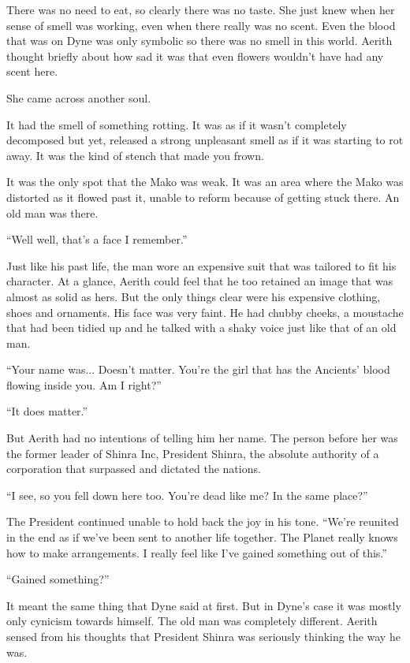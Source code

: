\documentclass[oneside]{book}
\begin{document}
There was no need to eat, so clearly there was no taste. She just knew when her sense of smell was working, even when there really was no scent. Even the blood that was on Dyne was only symbolic so there was no smell in this world. Aerith thought briefly about how sad it was that even flowers wouldn't have had any scent here.

She came across another soul.

It had the smell of something rotting. It was as if it wasn't completely decomposed but yet, released a strong unpleasant smell as if it was starting to rot away. It was the kind of stench that made you frown.

It was the only spot that the Mako was weak. It was an area where the Mako was distorted as it flowed past it, unable to reform because of getting stuck there. An old man was there.

“Well well, that's a face I remember.”

Just like his past life, the man wore an expensive suit that was tailored to fit his character. At a glance, Aerith could feel that he too retained an image that was almost as solid as hers. But the only things clear were his expensive clothing, shoes and ornaments. His face was very faint. He had chubby cheeks, a moustache that had been tidied up and he talked with a shaky voice just like that of an old man.

“Your name was... Doesn't matter. You're the girl that has the Ancients' blood flowing inside you. Am I right?”

“It does matter.”

But Aerith had no intentions of telling him her name. The person before her was the former leader of Shinra Inc, President Shinra, the absolute authority of a corporation that surpassed and dictated the nations.

“I see, so you fell down here too. You're dead like me? In the same place?”

The President continued unable to hold back the joy in his tone. “We're reunited in the end as if we've been sent to another life together. The Planet really knows how to make arrangements. I really feel like I've gained something out of this.”

“Gained something?”

It meant the same thing that Dyne said at first. But in Dyne's case it was mostly only cynicism towards himself. The old man was completely different. Aerith sensed from his thoughts that President Shinra was seriously thinking the way he was.
\end{document}
